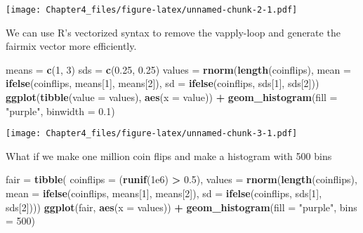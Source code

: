 \documentclass[]{article}
\newenvironment{Shaded}{\begin{snugshade}}{\end{snugshade}}
\newcommand{\DataTypeTok}[1]{\textcolor[rgb]{0.13,0.29,0.53}{#1}}
\newcommand{\DecValTok}[1]{\textcolor[rgb]{0.00,0.00,0.81}{#1}}
\newcommand{\FloatTok}[1]{\textcolor[rgb]{0.00,0.00,0.81}{#1}}
\newcommand{\KeywordTok}[1]{\textcolor[rgb]{0.13,0.29,0.53}{\textbf{#1}}}
\newcommand{\NormalTok}[1]{#1}
\newcommand{\OperatorTok}[1]{\textcolor[rgb]{0.81,0.36,0.00}{\textbf{#1}}}
\newcommand{\StringTok}[1]{\textcolor[rgb]{0.31,0.60,0.02}{#1}}
\begin{document}
\texttt{[image: Chapter4\_files/figure-latex/unnamed-chunk-2-1.pdf]}

We can use R's vectorized syntax to remove the vapply-loop and generate
the fairmix vector more efficiently.

\begin{Shaded}
\begin{Highlighting}[]
\NormalTok{means =}\StringTok{ }\KeywordTok{c}\NormalTok{(}\DecValTok{1}\NormalTok{, }\DecValTok{3}\NormalTok{)}
\NormalTok{sds   =}\StringTok{ }\KeywordTok{c}\NormalTok{(}\FloatTok{0.25}\NormalTok{, }\FloatTok{0.25}\NormalTok{)}
\NormalTok{values =}\StringTok{ }\KeywordTok{rnorm}\NormalTok{(}\KeywordTok{length}\NormalTok{(coinflips),}
          \DataTypeTok{mean =} \KeywordTok{ifelse}\NormalTok{(coinflips, means[}\DecValTok{1}\NormalTok{], means[}\DecValTok{2}\NormalTok{]),}
          \DataTypeTok{sd   =} \KeywordTok{ifelse}\NormalTok{(coinflips, sds[}\DecValTok{1}\NormalTok{],   sds[}\DecValTok{2}\NormalTok{]))}
\KeywordTok{ggplot}\NormalTok{(}\KeywordTok{tibble}\NormalTok{(}\DataTypeTok{value =}\NormalTok{ values), }\KeywordTok{aes}\NormalTok{(}\DataTypeTok{x =}\NormalTok{ value)) }\OperatorTok{+}
\StringTok{     }\KeywordTok{geom_histogram}\NormalTok{(}\DataTypeTok{fill =} \StringTok{"purple"}\NormalTok{, }\DataTypeTok{binwidth =} \FloatTok{0.1}\NormalTok{)}
\end{Highlighting}
\end{Shaded}

\texttt{[image: Chapter4\_files/figure-latex/unnamed-chunk-3-1.pdf]}

What if we make one million coin flips and make a histogram with 500
bins

\begin{Shaded}
\begin{Highlighting}[]
\NormalTok{fair =}\StringTok{ }\KeywordTok{tibble}\NormalTok{(}
  \DataTypeTok{coinflips =}\NormalTok{ (}\KeywordTok{runif}\NormalTok{(}\FloatTok{1e6}\NormalTok{) }\OperatorTok{>}\StringTok{ }\FloatTok{0.5}\NormalTok{),}
  \DataTypeTok{values =} \KeywordTok{rnorm}\NormalTok{(}\KeywordTok{length}\NormalTok{(coinflips),}
               \DataTypeTok{mean =} \KeywordTok{ifelse}\NormalTok{(coinflips, means[}\DecValTok{1}\NormalTok{], means[}\DecValTok{2}\NormalTok{]),}
               \DataTypeTok{sd   =} \KeywordTok{ifelse}\NormalTok{(coinflips, sds[}\DecValTok{1}\NormalTok{],   sds[}\DecValTok{2}\NormalTok{])))}
\KeywordTok{ggplot}\NormalTok{(fair, }\KeywordTok{aes}\NormalTok{(}\DataTypeTok{x =}\NormalTok{ values)) }\OperatorTok{+}
\StringTok{     }\KeywordTok{geom_histogram}\NormalTok{(}\DataTypeTok{fill =} \StringTok{"purple"}\NormalTok{, }\DataTypeTok{bins =} \DecValTok{500}\NormalTok{)}
\end{Highlighting}
\end{Shaded}
\end{document}
